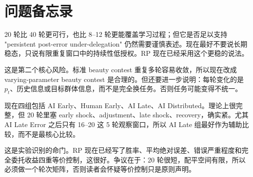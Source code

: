 \documentclass[12pt]{article}
\begin{document}
\begin{center}
\end{center}




\appendix
\section{问题备忘录}

\begin{tcolorbox}[colback=blue!5!white, colframe=blue!75!black, title=\textbf{M1：20 轮到底够不够？}]
20 轮比 40 轮更可行，也比 8–12 轮更能覆盖学习过程；但它是否足以支持 "persistent post-error under-delegation" 仍然需要谨慎表述。现在最好不要说长期稳态，只说有限重复窗口中的持续性低授权。RP 现在已经采用这个更稳的说法。
\end{tcolorbox}

\begin{tcolorbox}[colback=blue!5!white, colframe=blue!75!black, title=\textbf{M2：选美博弈会不会太快被学会？}]
这是第二个核心风险。标准 beauty contest 重复多轮容易收敛，所以现在改成 varying-parameter beauty contest 是合理的。但还要进一步说明：每轮变化的是 $p_t$、历史信息或目标群体信息，而不是完全换任务。否则任务可能变得不统一。
\end{tcolorbox}

\begin{tcolorbox}[colback=blue!5!white, colframe=blue!75!black, title=\textbf{M3：四组条件在 20 轮内会不会太挤？}]
现在四组包括 AI Early、Human Early、AI Late、AI Distributed。理论上很完整，但 20 轮里塞 early shock、adjustment、late shock、recovery，确实紧。尤其 AI Late Error 之后只有 16–20 这 5 轮观察窗口，所以 AI Late 组最好作为辅助比较，而不是最核心比较。
\end{tcolorbox}

\begin{tcolorbox}[colback=red!5!white, colframe=red!75!black, title=\textbf{M4：AI 与 human analyst 的表现等价能不能真的做到？}]
这是实验识别的命门。RP 现在已经写了胜率、平均绝对误差、错误严重程度和完全委托收益四重等价控制，这很好。争议在于：20 轮很短，配平空间有限，所以必须做一个轮次矩阵，否则读者会怀疑等价控制只是原则声明。
\end{tcolorbox}
\end{document}
